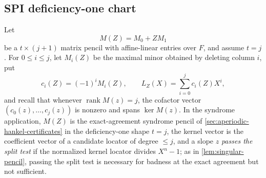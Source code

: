 \documentclass[11pt]{article}
\theoremstyle{definition}
\theoremstyle{remark}
\begin{document}
\subsection{SPI deficiency-one chart}

Let
\[
        M(Z)=M_0+ZM_1
\]
be a $t\times(j+1)$ matrix pencil with affine-linear entries over $F$, and assume $t=j$.  For $0\le i\le j$, let $M_i(Z)$ be the maximal minor obtained by deleting column $i$, put
\[
        c_i(Z)=(-1)^iM_i(Z),
        \qquad
        L_Z(X)=\sum_{i=0}^{j}c_i(Z)X^i,
\]
and recall that whenever $\operatorname{rank}M(z)=j$, the cofactor vector $(c_0(z),\ldots,c_j(z))$ is nonzero and spans $\ker M(z)$.  In the syndrome application, $M(Z)$ is the exact-agreement syndrome pencil of \cref{sec:aperiodic-hankel-certificates} in the deficiency-one shape $t=j$, the kernel vector is the coefficient vector of a candidate locator of degree $\le j$, and a slope $z$ \emph{passes the split test} if the normalized kernel locator divides $X^n-1$; as in \cref{lem:singular-pencil}, passing the split test is necessary for badness at the exact agreement but not sufficient.
\end{document}
